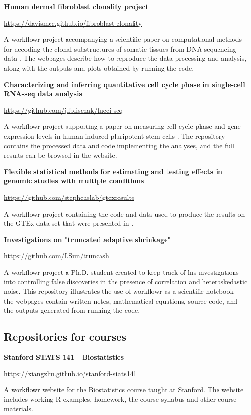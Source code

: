 \documentclass[9pt,a4paper]{extarticle}
\begin{document}
\textbf{Human dermal fibroblast clonality project}

\url{https://davismcc.github.io/fibroblast-clonality}

A workflowr project accompanying a scientific paper on computational
methods for decoding the clonal substructures of somatic tissues from
DNA sequencing data \cite{McCarthy2018}. The webpages describe how to
reproduce the data processing and analysis, along with the outputs and
plots obtained by running the code.

\textbf{Characterizing and inferring quantitative cell cycle phase in
single-cell RNA-seq data analysis}

\url{https://github.com/jdblischak/fucci-seq}

A workflowr project supporting a paper on measuring cell cycle phase and
gene expression levels in human induced pluripotent stem cells
\cite{Hsiao2019}. The repository contains the processed data and code
implementing the analyses, and the full results can be browsed in the
website.

\textbf{Flexible statistical methods for estimating and testing effects
in genomic studies with multiple conditions}

\url{https://github.com/stephenslab/gtexresults}

A workflowr project containing the code and data used to produce the
results on the GTEx data set that were presented in \cite{Urbut2018}.

\textbf{Investigations on "truncated adaptive shrinkage"}

\url{https://github.com/LSun/truncash}

A workflowr project a Ph.D. student created to keep track of his
investigations into controlling false discoveries in the presence of
correlation and heteroskedastic noise. This repository illustrates the
use of workflowr as a scientific notebook --- the webpages contain
written notes, mathematical equations, source code, and the outputs
generated from running the code.

\subsection*{Repositories for courses}

\textbf{Stanford STATS 141—Biostatistics}

\url{https://xiangzhu.github.io/stanford-stats141}

A workflowr website for the Biostatistics course taught at Stanford. The
website includes working R examples, homework, the course syllabus and
other course materials.
\end{document}
